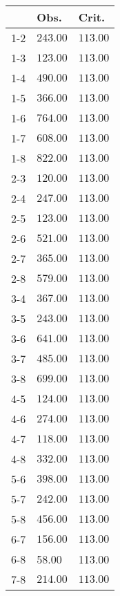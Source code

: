 \begin{table}[ht]
\centering
\begin{tabular}{rll}
  \hline
 & Obs. & Crit. \\ 
  \hline
1-2 & \(\mathbf{243.00}\) & \(\mathbf{113.00}\) \\ 
  1-3 & \(\mathbf{123.00}\) & \(\mathbf{113.00}\) \\ 
  1-4 & \(\mathbf{490.00}\) & \(\mathbf{113.00}\) \\ 
  1-5 & \(\mathbf{366.00}\) & \(\mathbf{113.00}\) \\ 
  1-6 & \(\mathbf{764.00}\) & \(\mathbf{113.00}\) \\ 
  1-7 & \(\mathbf{608.00}\) & \(\mathbf{113.00}\) \\ 
  1-8 & \(\mathbf{822.00}\) & \(\mathbf{113.00}\) \\ 
  2-3 & \(\mathbf{120.00}\) & \(\mathbf{113.00}\) \\ 
  2-4 & \(\mathbf{247.00}\) & \(\mathbf{113.00}\) \\ 
  2-5 & \(\mathbf{123.00}\) & \(\mathbf{113.00}\) \\ 
  2-6 & \(\mathbf{521.00}\) & \(\mathbf{113.00}\) \\ 
  2-7 & \(\mathbf{365.00}\) & \(\mathbf{113.00}\) \\ 
  2-8 & \(\mathbf{579.00}\) & \(\mathbf{113.00}\) \\ 
  3-4 & \(\mathbf{367.00}\) & \(\mathbf{113.00}\) \\ 
  3-5 & \(\mathbf{243.00}\) & \(\mathbf{113.00}\) \\ 
  3-6 & \(\mathbf{641.00}\) & \(\mathbf{113.00}\) \\ 
  3-7 & \(\mathbf{485.00}\) & \(\mathbf{113.00}\) \\ 
  3-8 & \(\mathbf{699.00}\) & \(\mathbf{113.00}\) \\ 
  4-5 & \(\mathbf{124.00}\) & \(\mathbf{113.00}\) \\ 
  4-6 & \(\mathbf{274.00}\) & \(\mathbf{113.00}\) \\ 
  4-7 & \(\mathbf{118.00}\) & \(\mathbf{113.00}\) \\ 
  4-8 & \(\mathbf{332.00}\) & \(\mathbf{113.00}\) \\ 
  5-6 & \(\mathbf{398.00}\) & \(\mathbf{113.00}\) \\ 
  5-7 & \(\mathbf{242.00}\) & \(\mathbf{113.00}\) \\ 
  5-8 & \(\mathbf{456.00}\) & \(\mathbf{113.00}\) \\ 
  6-7 & \(\mathbf{156.00}\) & \(\mathbf{113.00}\) \\ 
  6-8 & 58.00 & 113.00 \\ 
  7-8 & \(\mathbf{214.00}\) & \(\mathbf{113.00}\) \\ 
   \hline
\end{tabular}
\end{table}
